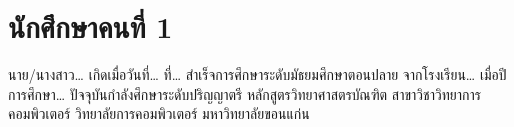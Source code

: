 %

\section*{นักศึกษาคนที่ 1}

นาย/นางสาว\ldots{} เกิดเมื่อวันที่\ldots{} ที่\ldots{}
สำเร็จการศึกษาระดับมัธยมศึกษาตอนปลาย จากโรงเรียน\ldots{} เมื่อปีการศึกษา\ldots{}
ปัจจุบันกำลังศึกษาระดับปริญญาตรี หลักสูตรวิทยาศาสตรบัณฑิต
สาขาวิชาวิทยาการคอมพิวเตอร์ วิทยาลัยการคอมพิวเตอร์ มหาวิทยาลัยขอนแก่น




%
